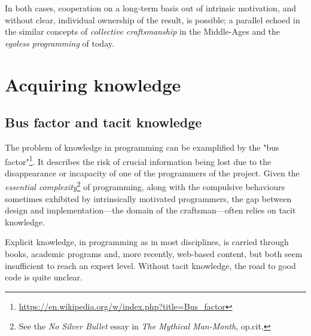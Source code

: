 \documentclass{article}
\begin{document}
In both cases, cooperation on a long-term basis out of intrinsic motivation, and without clear, individual ownership of the result, is possible; a parallel echoed in the similar concepts of \textit{collective craftsmanship} in the Middle-Ages and the \emph{egoless programming} of today\cite{brooks_mythical_1975}.

\section{Acquiring knowledge}

\subsection{Bus factor and tacit knowledge}

The problem of knowledge in programming can be examplified by the "bus factor"\footnote{\url{https://en.wikipedia.org/w/index.php?title=Bus_factor}}. It describes the risk of crucial information being lost due to the disappearance or incapacity of one of the programmers of the project. Given the \emph{essential complexity}\footnote{See the \textit{No Silver Bullet} essay in \emph{The Mythical Man-Month}, op.cit.} of programming, along with the compulsive behaviours sometimes exhibited by intrinsically motivated programmers\cite{weizenbaum_computer_1976}, the gap between design and implementation---the domain of the craftsman---often relies on tacit knowledge\cite{collins_tacit_2010}.

Explicit knowledge, in programming as in most disciplines, is carried through books, academic programs and, more recently, web-based content, but both seem insufficient to reach an expert level\cite{davies_models_1993}. Without tacit knowledge, the road to good code is quite unclear.
\end{document}
